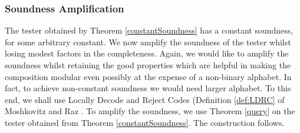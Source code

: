 \subsubsection*{Soundness Amplification}

The tester obtained by Theorem \ref{constantSoundness} has a constant
soundness, for some arbitrary constant. We now amplify the soundness
of the tester whilst losing modest factors in the completeness.
Again, we would like to amplify the soundness whilst retaining the
good properties which are helpful in making the composition modular
even possibly at the expense of a non-binary alphabet. In fact, to
achieve non-constant soundness we would need larger alphabet. To this
end, we shall use Locally Decode and Reject Codes (Definition \ref{def:LDRC} of Moshkovitz and
Raz \cite{MR08}. To amplify the soundness, we use Theorem \ref{query}
on the tester obtained from Theorem \ref{constantSoundness}. The
construction follows.


